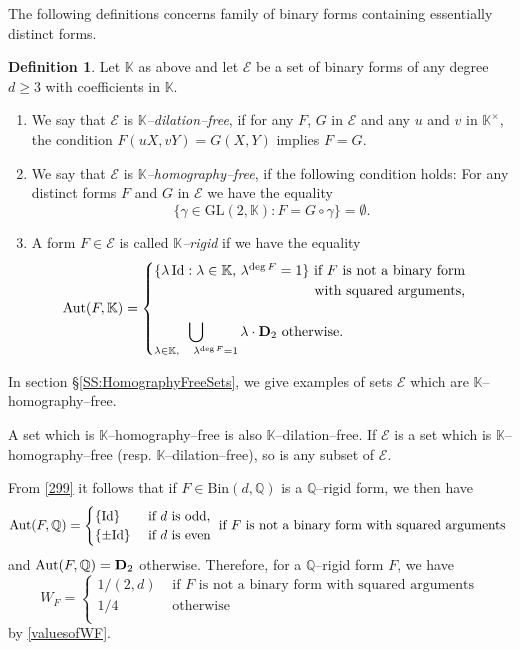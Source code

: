 \documentclass[10pt]{article}
\theoremstyle{definition}
\newtheorem{definition}[theorem]{Definition}
\numberwithin{equation}{section}
\newcommand {\Q}{{\mathbb{Q}}}
\newcommand {\K}{{\mathbb{K}}}
\newcommand{\Bin}{\mathrm {Bin}}
\newcommand{\GL}{\mathrm {GL}}
\begin{document}
 The following definitions concerns family of binary forms containing essentially distinct forms. 
 \begin{definition} \label{definition:dilation homograph free}
 Let $\K$ as above and let $\mathcal E$ be a set of binary forms of any degree $d\geqslant 3$ with coefficients in $\K$. 
\begin{enumerate}
\item We say that $\mathcal E$ is {\em $\K$--dilation--free}, if for any $F$, $G$ in $\mathcal E$ and any $u$ and $v$ in $\K^\times$, 
the condition $F(uX,vY)=G(X,Y)$ implies $F=G$. 
 
\item We say that $\mathcal E$ is {\em $\K$--homography--free}, if the following 
 condition holds:
For any distinct forms $F$ and $G$ in $\mathcal E$ we have the equality
 \[
 \{ \gamma \in {\GL}(2, \K) : F= G\circ \gamma \} =\emptyset.
 \]
\item A form $F \in \mathcal E$ is called {\em $\K$--rigid}
 if we have the equality 
 \begin{equation}\label{299}
{\rm Aut}(F, \K)
 = 
 \begin{cases}\{ \lambda\, {\rm Id} : \lambda \in \K,\, \lambda^{\deg F} =1\} \text{ if } F \text{ is not a binary form}\\
 \hfill\text{ with squared arguments,}
 \\
 \\
\displaystyle {\bigcup_{\lambda \in \K,\quad \lambda^{\deg F} =1}\lambda\cdot {\mathbf D}_2}\text{ otherwise.}\\
 \end{cases}
\end{equation}
 \end{enumerate} 
\end{definition} 
 
 In section \S\ref{SS:HomographyFreeSets}, we give examples of sets $\mathcal E$ which are $\K$--homography--free. 

A set which is $\K$--homography--free is also $\K$--dilation--free. 
 If $\mathcal E$ is a set which is $\K$--homography--free (resp. $\K$--dilation--free), so is any subset of $\mathcal E$.

From \eqref{299} it follows that if $F\in \Bin  (d, \Q)$ is a $\Q$--rigid form, we then have 
 \[
 {\rm Aut}(F, \Q)=
\begin{cases}
\{\mathrm{Id}\} &\text{
if $d$ is odd,}
\\
\{\pm \mathrm{Id}\} &\text{
if $d$ is even}
\end{cases}\text{ if $F$ is not a binary form with squared arguments }
 \] 
 and ${\rm Aut}(F, \Q)= \mathbf D_2$ otherwise. 
Therefore, for a $\Q$--rigid form $F$, we have 
 \begin{equation}\label{=1/2ou1/4}
 W_F =
 \begin{cases}
1/(2,d)
& \text{ if } F \text{ is not a binary form with squared arguments}
 \\
 1/4
 & \text{ otherwise }
\\ 
\end{cases}
\end{equation}
 by \eqref{valuesofWF}. 
 
\end{document}
